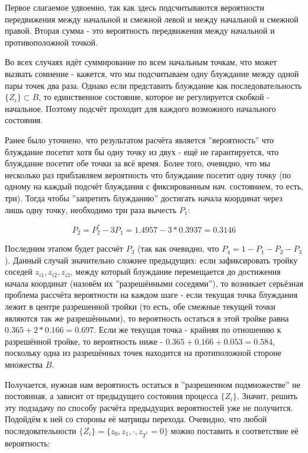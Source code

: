 Первое слагаемое удвоенно, так как здесь подсчитываются вероятности передвижения между начальной и смежной левой и между начальной и смежной правой.
Вторая сумма - это вероятность передвижения между начальной и противоположной точкой.

Во всех случаях идёт суммирование по всем начальным точкам, что может вызвать сомнение - кажется, что мы подсчитываем одну блуждание между одной пары точек два раза.
Однако если представить блуждание как последовательность $\{Z_i\} \subset B$, то единственное состояние, которое не регулируется скобкой - начальное. 
Поэтому подсчёт проходит для каждого возможного начального состояния.

Ранее было уточнено, что результатом расчёта является ''вероятность'' что блуждание посетит хотя бы одну точку из двух - 
ещё не гарантируется, что блуждание посетит обе точки за всё время. 
Более того, очевидно, что мы несколько раз приблавляем вероятность что блуждание посетит одну точку (по одному на каждый подсчёт блуждания с фиксированным нач. состоянием, то есть, три).
Тогда чтобы ''запретить блужданию'' достигать начала координат через лишь одну точку, необходимо три раза вычесть $P_1$:

\[ P_2 = P_2^* - 3 P_1 = 1.4957 - 3 * 0.3937 = 0.3146 \]

Последним этапом будет рассчёт $P_3$ (так как очевидно, что $P_4 = 1 - P_1 - P_2 - P_3$). 
Данный случай значительно сложнее предыдущих: если зафиксировать тройку соседей $z_{i1}, z_{i2}, z_{i3}$, между который блуждание перемещается до достижения начала координат (назовём их ''разрешёнными соседями''),
то возникает серьёзная проблема рассчёта вероятности на каждом шаге - если текущая точка блуждания лежит в центре разрешенной тройки (то есть, обе смежные текущей точки являются так же разрешёнными),
то вероятность остаться в этой тройке равна $0.365 + 2 * 0.166 = 0.697$. Если же текущая точка - крайняя по отношению к разрешённой тройке, то вероятность ниже - $0.365 + 0.166 + 0.053 = 0.584$, поскольку одна из 
разрешённых точек находится на протиположной стороне множества $B$.

Получается, нужная нам вероятность остаться в ''разрешенном подмножестве'' не постоянная, а зависит от предыдущего состояния процесса $\{Z_i\}$.
Значит, решить эту подзадачу по способу расчёта предыдущих вероятностей уже не получится.
Подойдём к ней со стороны её матрицы перехода. Очевидно, что любой последовательности $\{Z_i\} = \{z_0, z_1, \cdot, z_{T^*} = 0\}$ можно поставить в соответствие её вероятность:

